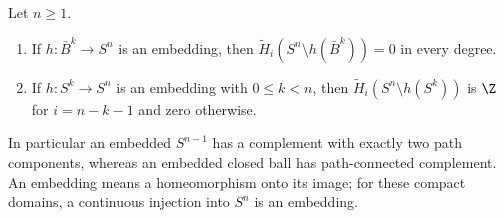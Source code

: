 \begin{proposition}\label{prop:jordanbrouwer}
Let $n\ge1$.
\begin{enumerate}
\item[(a)] If $h:\bar B^k\to S^n$ is an embedding, then $\tilde H_i(S^n\setminus h(\bar B^k))=0$ in every degree.
\item[(b)] If $h:S^k\to S^n$ is an embedding with $0\le k<n$, then $\tilde H_i(S^n\setminus h(S^k))$ is $\Z$ for $i=n-k-1$ and zero otherwise.
\end{enumerate}
In particular an embedded $S^{n-1}$ has a complement with exactly two path components, whereas an embedded closed ball has path-connected complement. An embedding means a homeomorphism onto its image; for these compact domains, a continuous injection into $S^n$ is an embedding.
\end{proposition}

